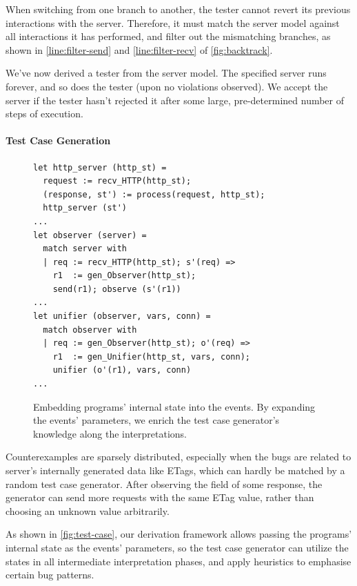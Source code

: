 When switching from one branch to another, the tester cannot revert its previous
interactions with the server.  Therefore, it must match the server model against
all interactions it has performed, and filter out the mismatching branches, as
shown in \autoref{line:filter-send} and \autoref{line:filter-recv} of
\autoref{fig:backtrack}.

We've now derived a tester from the server model.  The specified server runs
forever, and so does the tester (upon no violations observed).  We accept the
server if the tester hasn't rejected it after some large, pre-determined number
of steps of execution.

\paragraph*{Test Case Generation}

\begin{figure}
  \begin{lstlisting}[style=customcoq]
let http_server (http_st) =
  request := recv_HTTP(http_st);
  (response, st') := process(request, http_st);
  http_server (st')
...
let observer (server) =
  match server with
  | req := recv_HTTP(http_st); s'(req) =>
    r1  := gen_Observer(http_st);
    send(r1); observe (s'(r1))
...
let unifier (observer, vars, conn) =
  match observer with
  | req := gen_Observer(http_st); o'(req) =>
    r1  := gen_Unifier(http_st, vars, conn);
    unifier (o'(r1), vars, conn)
...
  \end{lstlisting}
  \caption{Embedding programs' internal state into the events.  By
    expanding the events' parameters, we enrich the test case generator's
    knowledge along the interpretations.}
  \label{fig:test-case}
\end{figure}

Counterexamples are sparsely distributed, especially when the bugs are related
to server's internally generated data like ETags, which can hardly be matched by
a random test case generator.  After observing the  field of some
response, the generator can send more requests with the same ETag value, rather
than choosing an unknown value arbitrarily.

As shown in \autoref{fig:test-case}, our derivation framework allows passing the
programs' internal state as the events' parameters, so the test case
generator can utilize the states in all intermediate interpretation phases, and
apply heuristics to emphasise certain bug patterns.

